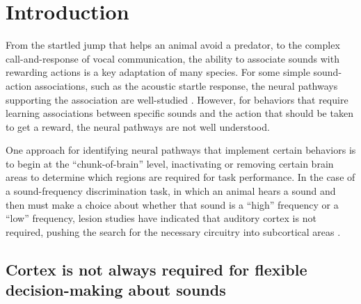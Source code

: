 \chapter{Introduction}

From the startled jump that helps an animal avoid a predator, to the complex call-and-response of vocal communication, the ability to associate sounds with rewarding actions is a key adaptation of many species. 
For some simple sound-action associations, such as the acoustic startle response, the neural pathways supporting the association are well-studied \citep{Davis1982}.
However, for behaviors that require learning associations between specific sounds and the action that should be taken to get a reward, the neural pathways are not well understood. 

One approach for identifying neural pathways that implement certain behaviors is to begin at the ``chunk-of-brain'' level, inactivating or removing certain brain areas to determine which regions are required for task performance.
In the case of a sound-frequency discrimination task, in which an animal hears a sound and then must make a choice about whether that sound is a ``high'' frequency or a ``low'' frequency, lesion studies have indicated that auditory cortex is not required, pushing the search for the necessary circuitry into subcortical areas \citep{Gimenez2015}.

\section{Cortex is not always required for flexible decision-making about sounds}

